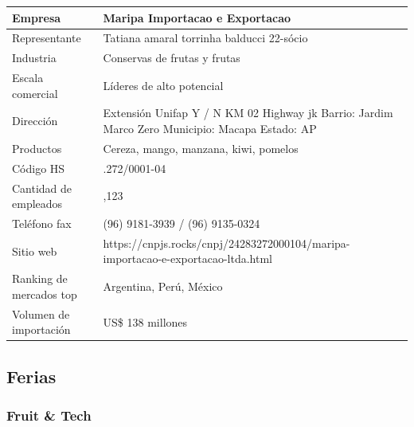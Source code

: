 \documentclass[
  stu,
  floatsintext,
  longtable,
  a4paper,
  nolmodern,
  notxfonts,
  notimes,
  12pt,
  colorlinks=true,linkcolor=blue,citecolor=blue,urlcolor=blue]{apa7}
\newcounter{none} %
\begin{document}
\begin{table}

{\caption{{Perfil Importador 2}{\label{tbl-importador2}}}}

{\def\LTcaptype{none} %
\begin{longtable}[]{@{}
  >{\raggedright\arraybackslash}p{}
  >{\raggedright\arraybackslash}p{}@{}}
\toprule\noalign{}
\begin{minipage}[b]{\linewidth}\raggedright
Empresa
\end{minipage} & \begin{minipage}[b]{\linewidth}\raggedright
Maripa Importacao e Exportacao
\end{minipage} \\
\midrule\noalign{}
\endhead
\bottomrule\noalign{}
\endlastfoot
Representante & Tatiana amaral torrinha balducci 22-sócio \\
Industria & Conservas de frutas y frutas \\
Escala comercial & Líderes de alto potencial \\
Dirección & Extensión Unifap Y / N KM 02 Highway jk Barrio: Jardim Marco
Zero Municipio: Macapa Estado: AP \\
Productos & Cereza, mango, manzana, kiwi, pomelos \\
Código HS & 24.283.272/0001-04 \\
Cantidad de empleados & 1,123 \\
Teléfono fax & (96) 9181-3939 / (96) 9135-0324 \\
Sitio web &
https://cnpjs.rocks/cnpj/24283272000104/maripa-importacao-e-exportacao-ltda.html \\
Ranking de mercados top & Argentina, Perú, México \\
Volumen de importación & US\$ 138 millones \\
\end{longtable}
}

\end{table}

\subsection{Ferias}\label{ferias}

\subsubsection{Fruit \& Tech}\label{fruit-tech}
\end{document}
